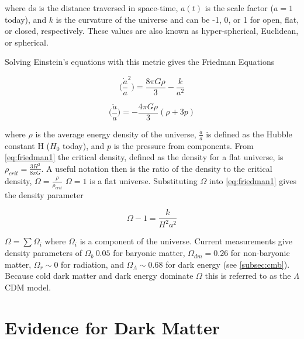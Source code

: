 \noindent where ds is the distance traversed in space-time, $a(t)$ is the scale factor ($a=1$ today), and $k$ is the curvature of the
universe and can be -1, 0, or 1 for open, flat, or closed, respectively.  These values are also known as hyper-spherical,
Euclidean, or spherical.

Solving Einstein's equations with this metric gives the Friedman Equations

\begin{equation}
\Big(\frac{\dot{a}}{a}^{2}\Big) = \frac{8\pi G \rho}{3} - \frac{k}{a^{2}}
\label{eq:friedman1}
\end{equation}

\begin{equation}
\Big(\frac{\ddot{a}}{a}\Big) = -\frac{4\pi G \rho}{3}(\rho + 3p)
\label{eq:friedman2}
\end{equation}

\noindent where $\rho$ is the average energy density of the universe, $\frac{\dot{a}}{a}$ is defined as the Hubble
constant H ($H_{0}$ today), and $p$ is the pressure from components.  From \eqref{eq:friedman1} the critical
density, defined as the density for a flat universe, is $\rho_{crit} = \frac{3H^{2}}{8\pi G}$.  A useful
notation then is the ratio of the density to the critical density, $\Omega = \frac{\rho}{\rho_{crit}}$
$\Omega = 1$ is a flat universe.  Substituting
$\Omega$ into \eqref{eq:friedman1} gives the density parameter

\begin{equation}
\Omega - 1 = \frac{k}{H^{2}{a^{2}}}
\end{equation}

\noindent  $\Omega = \sum \Omega_{i}$ where $\Omega_{i}$ is a component of the universe.  Current measurements give density
parameters of $\Omega_{b} ~ 0.05$ for baryonic matter, $\Omega_{dm} = 0.26$ for non-baryonic matter, $\Omega_{r} \sim 0$
for radiation, and $\Omega_{\Lambda} \sim 0.68$ for dark energy (see \ref{subsec:cmb}).  Because cold dark matter
and dark energy dominate $\Omega$ this is referred to as the $\Lambda$CDM model.



\section[Evidence for Dark Matter][Evidence for Dark Matter]{Evidence for Dark Matter}
